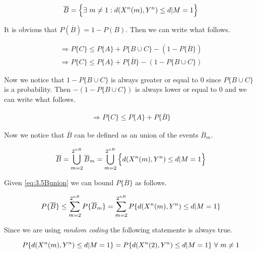 \begin{align*}
	\overline{B} = \Big \{ \exists \  m \neq 1 : d(X^n(m),Y^n) \leq d | M = 1 \Big \}
\end{align*}

 It is obvious that $P(\overline{B})=1-P(B)$. Then we can write what follows.

 \begin{equation}
 	\begin{gathered}
		\Rightarrow P \{ C \} \leq P \{ A \} + P \{ B \cup C \} -(1-P\{\overline{B} \})  \\
		\Rightarrow P \{ C \} \leq P \{ A \} + P\{\overline{B} \}-(1-P \{ B \cup C \} )
 	\end{gathered}
 \end{equation}

Now we notice that $1-P \{ B \cup C \}$ is always greater or equal to $0$ since $P \{ B \cup C \}$ is a probability. Then $-(1-P \{ B \cup C \})$ is always lower or equal to $0$ and we can write what follows.

\begin{equation}
 \begin{gathered}
	 \Rightarrow P \{ C \} \leq P \{ A \} + P\{\overline{B} \}
 \end{gathered}
\label{eq:3.5diseq}
\end{equation}

Now we notice that $\overline{B}$ can be defined as an union of the events $\overline{B}_m$.

\begin{equation}
		\overline{B} = \bigcup _{m=2}^{2^{nR}} \overline{B}_m = \bigcup _{m=2}^{2^{nR}} \Big \{ d(X^n(m),Y^n) \leq d | M = 1\Big \}
		\label{eq:3.5Bunion}
\end{equation}

Given \eqref{eq:3.5Bunion} we can bound $P\{ \overline{B}\}$ as follows.

\begin{equation}
	P\{\overline{B} \} \leq \sum_{m=2}^{2^{nR}} P \{ \overline{B}_m \} = \sum_{m=2}^{2^{nR}} P \{ d(X^n(m),Y^n) \leq d | M = 1 \}
	\label{eq:3.5Bsum}
\end{equation}

Since we are using \textit{random coding} the following statemente is always true.

\begin{equation}
	P \{ d(X^n(m),Y^n) \leq d | M = 1 \} = P \{ d(X^n(2),Y^n) \leq d | M = 1  \} \ \forall \ m \neq 1
\end{equation}

